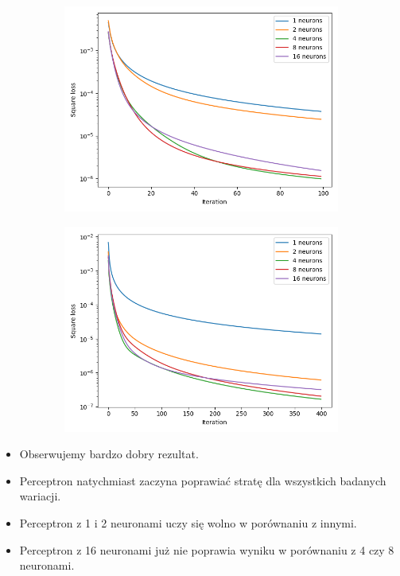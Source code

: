 \documentclass[12pt,a4paper]{article}
\begin{document}
\begin{figure}[h]
  \centering
\begin{subfigure}{0.5\textwidth}
  \includegraphics[width=\linewidth]{charts/no_output_activation/noactiv400iter_lr01_custw.png}
  \caption{}
  \label{}
\end{subfigure}\hfil
\begin{subfigure}{0.5\textwidth}
  \includegraphics[width=\linewidth]{charts/no_output_activation/noactiv400iter_lr01_custw2.png}
  \caption{}
  \label{}
\end{subfigure}

\end{figure}

\begin{itemize}
  \item   Obserwujemy bardzo dobry rezultat.
  \item   Perceptron natychmiast zaczyna poprawiać stratę dla wszystkich badanych wariacji.
  \item   Perceptron z 1 i 2 neuronami uczy się wolno w porównaniu z innymi.
  \item   Perceptron z 16 neuronami już nie poprawia wyniku w porównaniu z 4 czy 8 neuronami.
\end{itemize}
\end{document}
